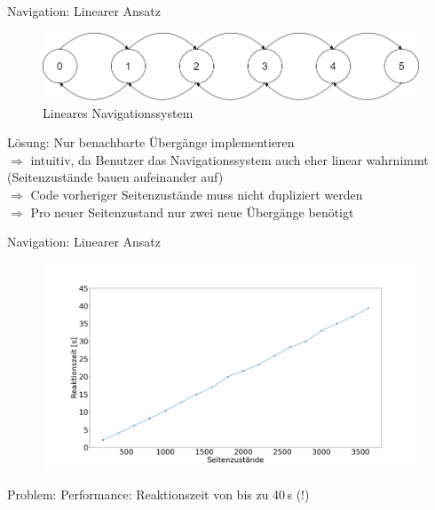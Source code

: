 \documentclass{beamer}
\begin{document}
\begin{frame}{Navigation: Linearer Ansatz}
\begin{figure}
\center
\begin{minipage}{\textwidth}
\includegraphics[width=\textwidth]{figures/navigationsystem-linear-overview.png}
\end{minipage}
\caption{Lineares Navigationssystem}
\end{figure}
Lösung: Nur benachbarte Übergänge implementieren\\
$\Rightarrow$ intuitiv, da Benutzer das Navigationssystem auch eher linear wahrnimmt (Seitenzustände bauen aufeinander auf)\\
$\Rightarrow$ Code vorheriger Seitenzustände muss nicht dupliziert werden\\
$\Rightarrow$ Pro neuer Seitenzustand nur zwei neue Übergänge benötigt
\end{frame}

\begin{frame}{Navigation: Linearer Ansatz}
\begin{figure}
\center
\begin{minipage}{\textwidth}
\includegraphics[width=\textwidth]{figures/performance_linear.png}
\end{minipage}
\end{figure}
Problem: Performance: Reaktionszeit von bis zu 40\,s (!)
\end{frame}
\end{document}
